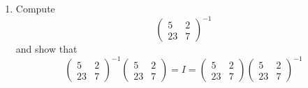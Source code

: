 \begin{enumerate}[nosep]
  \item
    Compute 
    \[
    \begin{pmatrix}
      5 & 2 \\
      23 & 7 
    \end{pmatrix}^{-1}
    \]
    and show that
    \[
    \begin{pmatrix}
      5 & 2 \\
      23 & 7 
    \end{pmatrix}^{-1}
    \begin{pmatrix}
      5 & 2 \\
      23 & 7 
    \end{pmatrix}
    =
    I
    =
    \begin{pmatrix}
      5 & 2 \\
      23 & 7 
    \end{pmatrix}
    \begin{pmatrix}
      5 & 2 \\
      23 & 7 
    \end{pmatrix}^{-1}
    \]
   
  \end{enumerate}
